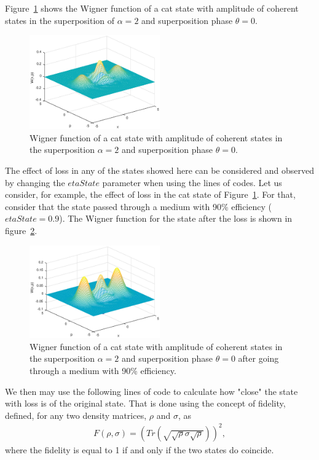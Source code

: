\documentclass[twocolumn]{rbef}
\begin{document}
Figure~\ref{fig-catstate} shows the Wigner function of a cat state with amplitude of coherent states in the superposition of $\alpha=2$ and superposition phase $\theta =0$. 

\begin{figure}[h]
\includegraphics[width=0.5\textwidth]{wigner-cat-2.eps}
\caption{Wigner function of a cat state with amplitude of coherent states in the superposition $\alpha=2$ and superposition phase $\theta =0$.}
\label{fig-catstate}
\end{figure}

The effect of loss in any of the states showed here can be considered and observed by changing the $etaState$ parameter when using the lines of codes. Let us consider, for example, the effect of loss in the cat state of Figure~\ref{fig-catstate}. For that, consider that the state passed through a medium with 90\% efficiency ($etaState = 0.9$). The Wigner function for the state after the loss is shown in figure~\ref{fig-catstate-loss}. 

\begin{figure}[h]
\includegraphics[width=0.5\textwidth]{wigner-cat-2-perda.eps}
\caption{Wigner function of a cat state with amplitude of coherent states in the superposition $\alpha=2$ and superposition phase $\theta =0$ after going through a medium with 90\% efficiency.}
\label{fig-catstate-loss}
\end{figure}

We then may use the following lines of code to calculate how "close" the state with loss is of the original state. That is done using the concept of fidelity, defined, for any two density matrices, $\rho$ and $\sigma$, as
\begin{eqnarray}
F(\rho,\sigma) = \left( Tr \left(\sqrt{\sqrt{\rho} \sigma \sqrt{\rho}}\right) \right)^2,
\end{eqnarray}
where the fidelity is equal to 1 if and only if the two states do coincide.
\end{document}
